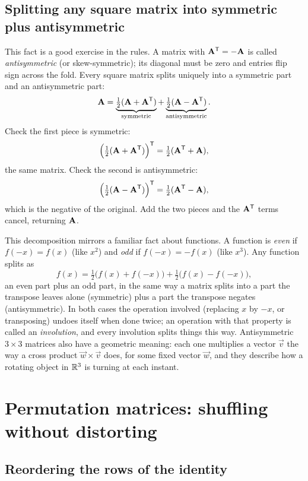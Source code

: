 \subsection{Splitting any square matrix into symmetric plus antisymmetric}

This fact is a good exercise in the rules. A matrix with $\mathbf{A}^{\mathsf{T}}=-\mathbf{A}$ is called
\emph{antisymmetric} (or skew-symmetric); its diagonal must be zero and entries flip sign across the
fold. Every square matrix splits uniquely into a symmetric part and an antisymmetric part:
\[
  \mathbf{A}
  = \underbrace{\tfrac12(\mathbf{A}+\mathbf{A}^{\mathsf{T}})}_{\text{symmetric}}
  + \underbrace{\tfrac12(\mathbf{A}-\mathbf{A}^{\mathsf{T}})}_{\text{antisymmetric}}.
\]
Check the first piece is symmetric:
\[
  \Bigl(\tfrac12(\mathbf{A}+\mathbf{A}^{\mathsf{T}})\Bigr)^{\mathsf{T}} = \tfrac12(\mathbf{A}^{\mathsf{T}}+\mathbf{A}),
\]
the same matrix. Check the second is antisymmetric:
\[
  \Bigl(\tfrac12(\mathbf{A}-\mathbf{A}^{\mathsf{T}})\Bigr)^{\mathsf{T}} = \tfrac12(\mathbf{A}^{\mathsf{T}}-\mathbf{A}),
\]
which is the negative of the original. Add the two pieces and the $\mathbf{A}^{\mathsf{T}}$ terms cancel,
returning $\mathbf{A}$.

\begin{connectionbox}
This decomposition mirrors a familiar fact about functions. A function is \emph{even} if
$f(-x)=f(x)$ (like $x^2$) and \emph{odd} if $f(-x)=-f(x)$ (like $x^3$). Any function splits as
\[
  f(x)=\tfrac12\bigl(f(x)+f(-x)\bigr)+\tfrac12\bigl(f(x)-f(-x)\bigr),
\]
an even part plus an odd part, in the same way a matrix splits into a part the transpose leaves
alone (symmetric) plus a part the transpose negates (antisymmetric). In both cases the operation
involved (replacing $x$ by $-x$, or transposing) undoes itself when done twice; an operation with
that property is called an \emph{involution}, and every involution splits things this way.
Antisymmetric $3\times 3$ matrices also have a geometric meaning: each one multiplies a vector
$\vec{v}$ the way a cross product $\vec{w}\times\vec{v}$ does, for some fixed vector $\vec{w}$, and
they describe how a rotating object in $\mathbb{R}^3$ is turning at each instant.
\end{connectionbox}

\section{Permutation matrices: shuffling without distorting}

\subsection{Reordering the rows of the identity}

